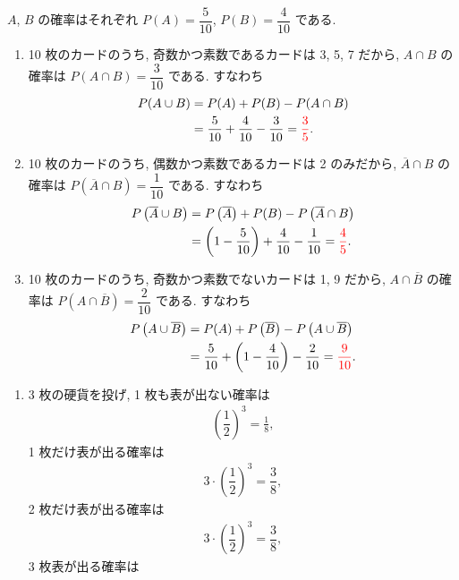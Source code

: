 \begin{qenumerate}
{		$A$, $B$ の確率はそれぞれ $P(A) = \dfrac{5}{10}$, $P(B) = \dfrac{4}{10}$ である.
		\begin{enumerate}
			\item{
				10 枚のカードのうち, 奇数かつ素数であるカードは 3, 5, 7 だから, $A\cap B$ の確率は $P(A\cap B) = \dfrac{3}{10}$ である.
				すなわち
				\begin{align}
					P(A\cup B) &= P(A) + P(B) - P(A\cap B) \\
						&= \frac{5}{10} + \frac{4}{10} - \frac{3}{10} = \textcolor{red}{\frac{3}{5}}.
				\end{align}
			}
			\item{
				10 枚のカードのうち, 偶数かつ素数であるカードは 2 のみだから, $\overline{A}\cap B$ の確率は $P\left(\overline{A}\cap B\right) = \dfrac{1}{10}$ である.
				すなわち
				\begin{align}
					P\left(\overline{A}\cup B\right) &= P\left(\overline{A}\right) + P(B) - P\left(\overline{A}\cap B\right) \\
						&= \left(1 - \frac{5}{10}\right) + \frac{4}{10} - \frac{1}{10} = \textcolor{red}{\frac{4}{5}}.
				\end{align}
			}
			\item{
				10 枚のカードのうち, 奇数かつ素数でないカードは 1, 9 だから, $A\cap \overline{B}$ の確率は $P\left(A\cap\overline{B}\right) = \dfrac{2}{10}$ である.
				すなわち
				\begin{align}
					P\left(A\cup\overline{B}\right) &= P(A) + P\left(\overline{B}\right) - P\left(A\cup\overline{B}\right) \\
						&= \frac{5}{10} + \left(1 - \frac{4}{10}\right) - \frac{2}{10} = \textcolor{red}{\frac{9}{10}}.
				\end{align}
			}
		\end{enumerate}
	}
	\item{
		\begin{enumerate}
			\item{
				3 枚の硬貨を投げ, 1 枚も表が出ない確率は 
				\begin{align}
					\left(\dfrac{1}{2}\right)^{3} = \frac{1}{8}, 
				\end{align}
				1 枚だけ表が出る確率は
				\begin{align}
					3\cdot\left(\dfrac{1}{2}\right)^{3} = \dfrac{3}{8}, 
				\end{align}
				2 枚だけ表が出る確率は
				\begin{align}
					3\cdot\left(\dfrac{1}{2}\right)^{3} = \dfrac{3}{8}, 
				\end{align}
				3 枚表が出る確率は
}
\end{enumerate}}
\end{qenumerate}

